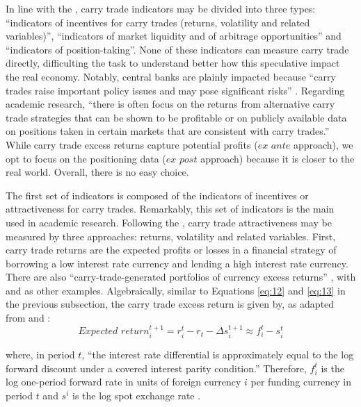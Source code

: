 \documentclass[a4paper, twoside]{templates/ociamthesis}
\begin{document}
In line with the \textcite[ 20]{bankforinternationalsettlements2015}, carry trade indicators may be divided into three types: ``indicators of incentives for carry trades (returns, volatility and related variables)'', ``indicators of market liquidity and of arbitrage opportunities'' and ``indicators of position-taking''. None of these indicators can measure carry trade directly, difficulting the task to understand better how this speculative impact the real economy. Notably, central banks are plainly impacted because ``carry trades raise important policy issues and may pose significant risks'' \autocite[ 2]{bankforinternationalsettlements2015}. Regarding academic research, ``there is often focus on the returns from alternative carry trade strategies that can be shown to be profitable or on publicly available data on positions taken in certain markets that are consistent with carry trades.'' \autocite[ 2]{bankforinternationalsettlements2015} While carry trade excess returns capture potential profits (\(ex\) \(ante\) approach), we opt to focus on the positioning data (\(ex\) \(post\) approach) because it is closer to the real world. Overall, there is no easy choice.

The first set of indicators is composed of the indicators of incentives or attractiveness for carry trades. Remarkably, this set of indicators is the main used in academic research. Following the \textcite[ 20]{bankforinternationalsettlements2015}, carry trade attractiveness may be measured by three approaches: returns, volatility and related variables. First, carry trade returns are the expected profits or losses in a financial strategy of borrowing a low interest rate currency and lending a high interest rate currency. There are also ``carry-trade-generated portfolios of currency excess returns'' \autocite[ 214]{berg2018}, with \textcite{lustig2007} and \textcite{cenedese2014} as other examples. Algebraically, similar to Equations \eqref{eq:12} and \eqref{eq:13} in the previous subsection, the carry trade excess return is given by, as adapted from \textcite[Equation (3),  688]{menkhoff2012} and \textcite[Equation (1),  3]{orlov2016}:
\begin{equation}
\textit{Expected return}_i^{t+1} = r_i^{t} - r_t - \Delta{s}_i^{t+1} \approx f_i^{t} - s_i^{t}
\label{eq:15}
\end{equation}

\noindent where, in period \(t\), ``the interest rate differential is approximately equal to the log forward discount under a covered interest parity condition.'' Therefore, \(f_i^{t}\) is the log one-period forward rate in units of foreign currency \(i\) per funding currency in period \(t\) and \(s^i\) is the log spot exchange rate \autocite[ 3]{orlov2016}.
\end{document}

